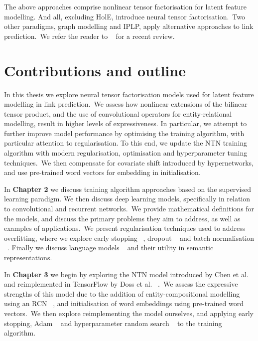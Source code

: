 \noindent The above approaches comprise nonlinear tensor factorisation for latent feature modelling. And all, excluding HolE, introduce neural tensor factorisation.\ Two other paradigms, graph modelling and IPLP, apply alternative approaches to link prediction.\ We refer the reader to \unskip~\citep{nickel2015review} for a recent review. \par



\section{Contributions and outline} %

\noindent In this thesis we explore neural tensor factorisation models used for latent feature modelling in link prediction.\ We assess how nonlinear extensions of the bilinear tensor product, and the use of convolutional operators for entity-relational modelling, result in higher levels of expressiveness. In particular, we attempt to further improve model performance by optimising the training algorithm, with particular attention to regularisation. To this end, we update the NTN training algorithm with modern regularisation, optimisation and hyperparameter tuning techniques.\ We then compensate for covariate shift introduced by hypernetworks, and use pre-trained word vectors for embedding in initialisation. \par

\noindent In \textbf{Chapter 2} we discuss training algorithm approaches based on the supervised learning paradigm. We then discuss deep learning models, specifically in relation to convolutional and recurrent networks.\ We provide mathematical definitions for the models, and discuss the primary problems they aim to address, as well as examples of applications.\ We present regularisation techniques used to address overfitting, where we explore early stopping \unskip~\citep{prechelt1998early}, dropout \unskip ~\citep{srivastava2014dropout} and batch normalisation \unskip ~\citep{ioffe2015batch}. Finally we discuss language models \unskip~\citep{ bojanowski2016enriching, vaswani2017attention} and their utility in semantic representations. \par

\noindent In \textbf{Chapter 3} we begin by exploring the NTN model introduced by Chen et al. \unskip ~\citep{socher2013reasoning} and reimplemented in TensorFlow by Doss et al. \unskip ~\citep{Doss2015}.\ We assess the expressive strengths of this model due to the addition of entity-compositional modelling using an RCN \unskip ~\citep{socher2012semantic}, and initialisation of word embeddings using pre-trained word vectors.\ We then explore reimplementing the model ourselves, and applying early stopping, Adam \unskip ~\citep{kingma2014adam} and hyperparameter random search \unskip ~\citep{bergstra2012random} to the training algorithm. \par

